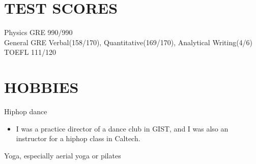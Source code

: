 \documentclass[margin, 10pt]{res} %
\begin{document}
\begin{resume}

\section{TEST SCORES} 

Physics GRE 990/990 \\
General GRE Verbal(158/170), Quantitative(169/170), Analytical Writing(4/6) \\
TOEFL 111/120\\


\section{HOBBIES} 

Hiphop dance
\begin{itemize}
\item[] I was a practice director of a dance club in GIST, and I was also an instructor for a hiphop class in Caltech.
\end{itemize}
Yoga, especially aerial yoga or pilates


\end{resume}
\end{document}
